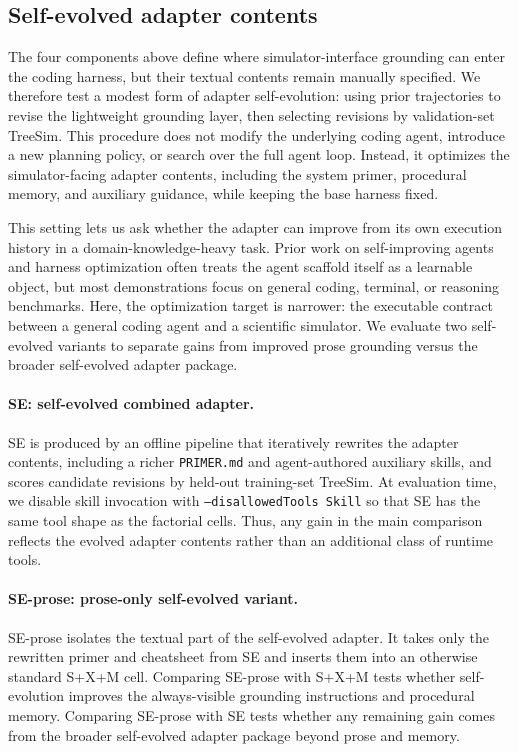 \documentclass{article}
\begin{document}

\subsection{Self-evolved adapter contents}
\label{subsec:self-evolved}

The four components above define where simulator-interface grounding can enter the coding harness, but their textual contents remain manually specified. 
We therefore test a modest form of adapter self-evolution: using prior trajectories to revise the lightweight grounding layer, then selecting revisions by validation-set TreeSim. 
This procedure does not modify the underlying coding agent, introduce a new planning policy, or search over the full agent loop. 
Instead, it optimizes the simulator-facing adapter contents, including the system primer, procedural memory, and auxiliary guidance, while keeping the base harness fixed.

This setting lets us ask whether the adapter can improve from its own execution history in a domain-knowledge-heavy task. 
Prior work on self-improving agents and harness optimization often treats the agent scaffold itself as a learnable object, but most demonstrations focus on general coding, terminal, or reasoning benchmarks. 
Here, the optimization target is narrower: the executable contract between a general coding agent and a scientific simulator. 
We evaluate two self-evolved variants to separate gains from improved prose grounding versus the broader self-evolved adapter package.

\paragraph{SE: self-evolved combined adapter.}
SE is produced by an offline pipeline that iteratively rewrites the adapter contents, including a richer \texttt{PRIMER.md} and agent-authored auxiliary skills, and scores candidate revisions by held-out training-set TreeSim. 
At evaluation time, we disable skill invocation with \texttt{--disallowedTools Skill} so that SE has the same tool shape as the factorial cells. 
Thus, any gain in the main comparison reflects the evolved adapter contents rather than an additional class of runtime tools.

\paragraph{SE-prose: prose-only self-evolved variant.}
SE-prose isolates the textual part of the self-evolved adapter. 
It takes only the rewritten primer and cheatsheet from SE and inserts them into an otherwise standard S+X+M cell. 
Comparing SE-prose with S+X+M tests whether self-evolution improves the always-visible grounding instructions and procedural memory. 
Comparing SE-prose with SE tests whether any remaining gain comes from the broader self-evolved adapter package beyond prose and memory.
\end{document}
